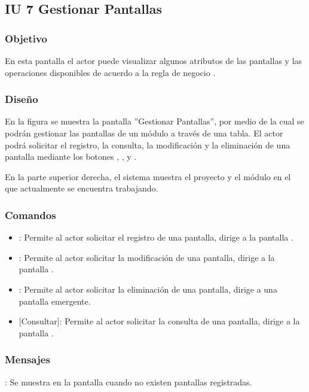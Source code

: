 \subsection{IU 7 Gestionar Pantallas}

\subsubsection{Objetivo}
	En esta pantalla el actor puede visualizar algunos atributos de las pantallas y las operaciones disponibles de acuerdo a la regla de negocio .
\subsubsection{Diseño}
	En la figura  se muestra la pantalla ''Gestionar Pantallas'', por medio de la cual se podrán gestionar las pantallas de un módulo a través de una tabla. El actor podrá solicitar el registro, la consulta, la modificación y la eliminación de una pantalla mediante los botones , , \editar y \eliminar.
	
	En la parte superior derecha, el sistema muestra el proyecto y el módulo en el que actualmente se encuentra trabajando.

\subsubsection{Comandos}
\begin{itemize}
	\item {}: Permite al actor solicitar el registro de una pantalla, dirige a la pantalla .
	\item \editar [Modificar]: Permite al actor solicitar la modificación de una pantalla, dirige a la pantalla .
	\item \eliminar [Eliminar]: Permite al actor solicitar la eliminación de una pantalla, dirige a una pantalla emergente.
	\item {} [Consultar]: Permite al actor solicitar la consulta de una pantalla, dirige a la pantalla  .
\end{itemize}
\subsubsection{Mensajes}

\begin{Citemize}
	\item {}: Se muestra en la pantalla  cuando no existen pantallas registradas.
\end{Citemize}
